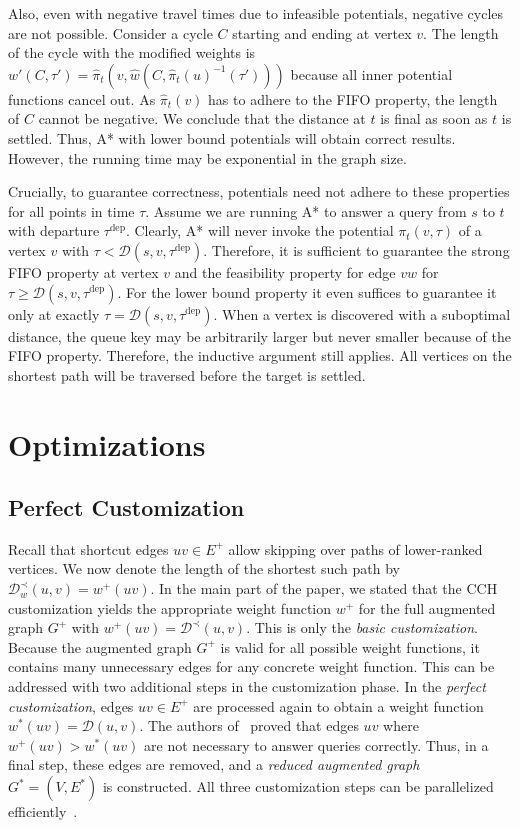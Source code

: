 \documentclass[a4paper,UKenglish,cleveref, autoref, thm-restate,anonymous]{lipics-v2021}
\newcommand*{\dist}{\mathcal{D}}
\newcommand*{\tdep}{\tau^{\operatorname{dep}}}
\begin{document}
Also, even with negative travel times due to infeasible potentials, negative cycles are not possible.
Consider a cycle $C$ starting and ending at vertex $v$.
The length of the cycle with the modified weights is $w'(C, \tau') = \hat{\pi}_t(v, \hat{w}(C, \hat{\pi}_t(u)^{-1}(\tau')))$ because all inner potential functions cancel out.
As $\hat{\pi}_t(v)$ has to adhere to the FIFO property, the length of $C$ cannot be negative.
We conclude that the distance at $t$ is final as soon as $t$ is settled.
Thus, A* with lower bound potentials will obtain correct results.
However, the running time may be exponential in the graph size.

Crucially, to guarantee correctness, potentials need not adhere to these properties for all points in time $\tau$.
Assume we are running A* to answer a query from $s$ to $t$ with departure $\tdep$.
Clearly, A* will never invoke the potential $\pi_t(v, \tau)$ of a vertex $v$ with $\tau < \dist(s,v,\tdep)$.
Therefore, it is sufficient to guarantee the strong FIFO property at vertex $v$ and the feasibility property for edge $vw$ for $\tau \geq \dist(s,v,\tdep)$.
For the lower bound property it even suffices to guarantee it only at exactly $\tau = \dist(s,v,\tdep)$.
When a vertex is discovered with a suboptimal distance, the queue key may be arbitrarily larger but never smaller because of the FIFO property.
Therefore, the inductive argument still applies.
All vertices on the shortest path will be traversed before the target is settled.

\section{Optimizations}\label{sec:appendix:optimizations}

\subsection{Perfect Customization}

Recall that shortcut edges $uv \in E^+$ allow skipping over paths of lower-ranked vertices.
We now denote the length of the shortest such path by $\dist^{\prec}_w(u,v) = w^+(uv)$.
In the main part of the paper, we stated that the CCH customization yields the appropriate weight function $w^+$ for the full augmented graph $G^+$ with $w^+(uv) = \dist^{\prec}(u,v)$.
This is only the \emph{basic customization}.
Because the augmented graph $G^+$ is valid for all possible weight functions, it contains many unnecessary edges for any concrete weight function.
This can be addressed with two additional steps in the customization phase.
In the \emph{perfect customization}, edges $uv \in E^+$ are processed again to obtain a weight function $w^*(uv) = \dist(u,v)$.
The authors of~\cite{dsw-cch-15} proved that edges $uv$ where $w^+(uv) > w^*(uv)$ are not necessary to answer queries correctly.
Thus, in a final step, these edges are removed, and a \emph{reduced augmented graph} $G^*=(V, E^*)$ is constructed.
All three customization steps can be parallelized efficiently~\cite{bsw-rttau-19}.
\end{document}
